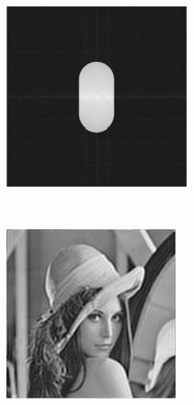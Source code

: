 \begin{figure}[h]
\begin{subfigure}[t]{0.23\textwidth}
      \caption{}
  \end{subfigure}~
  \begin{subfigure}[t]{0.23\textwidth}
      \centering
      \includegraphics[width=\textwidth]{msim_slit/fft_single}
      \caption{}
  \end{subfigure}\\
  \begin{subfigure}[t]{0.23\textwidth}
      \centering
      \includegraphics[width=\textwidth]{msim_slit/msim_recon}

\end{subfigure}
\end{figure}
